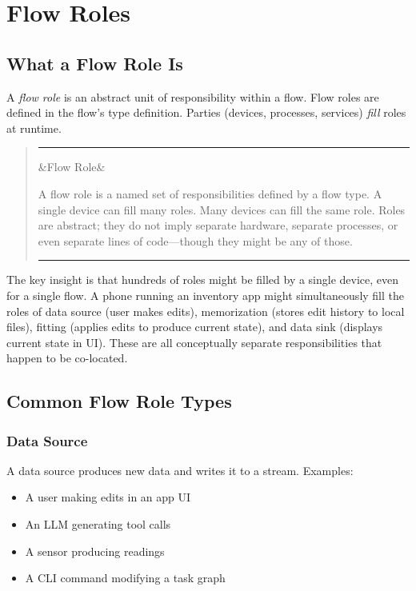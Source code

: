 \documentclass[11pt, letterpaper]{article}
\newenvironment{definition}[1][]
  {\par\medskip\begin{quote}
   \color{rimdark}\rule{\dimexpr\linewidth}{1.5pt}\par\smallskip
   \ifx&#1&\else\noindent{\bfseries #1}\par\smallskip\fi}
  {\par\smallskip\color{rimdark}\rule{\dimexpr\linewidth}{1.5pt}
   \end{quote}\medskip}
\begin{document}
\newpage
\section{Flow Roles}
\label{sec:roles}

\subsection{What a Flow Role Is}

A \emph{flow role} is an abstract unit of responsibility within a flow. Flow roles are
defined in the flow's type definition. Parties (devices, processes, services) \emph{fill}
roles at runtime.

\begin{definition}[Flow Role]
A flow role is a named set of responsibilities defined by a flow type. A single device
can fill many roles. Many devices can fill the same role. Roles are abstract; they do not
imply separate hardware, separate processes, or even separate lines of code---though
they might be any of those.
\end{definition}

The key insight is that hundreds of roles might be filled by a single device, even for
a single flow. A phone running an inventory app might simultaneously fill the roles of
data source (user makes edits), memorization (stores edit history to local files),
fitting (applies edits to produce current state), and data sink (displays current
state in UI). These are all conceptually separate responsibilities that happen to be
co-located.

\subsection{Common Flow Role Types}

\subsubsection{Data Source}

A data source produces new data and writes it to a stream. Examples:
\begin{itemize}[leftmargin=2em]
  \item A user making edits in an app UI
  \item An LLM generating tool calls
  \item A sensor producing readings
  \item A CLI command modifying a task graph
\end{itemize}
\end{document}

